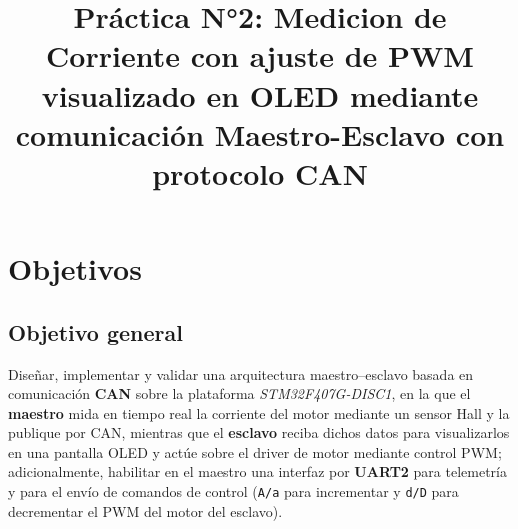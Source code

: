 \documentclass[a4paper,12pt]{article}
\title{Práctica N°2: Medicion de Corriente con ajuste de PWM visualizado en OLED mediante comunicación Maestro-Esclavo con protocolo CAN}
\date{}
\begin{document}
\maketitle
\tableofcontents
\newpage


\section{Objetivos}

\subsection{Objetivo general}
Diseñar, implementar y validar una arquitectura maestro--esclavo basada en comunicación \textbf{CAN} sobre la plataforma \textit{STM32F407G-DISC1}, en la que el \textbf{maestro} mida en tiempo real la corriente del motor mediante un sensor Hall y la publique por CAN, mientras que el \textbf{esclavo} reciba dichos datos para visualizarlos en una pantalla OLED y actúe sobre el driver de motor mediante control PWM; adicionalmente, habilitar en el maestro una interfaz por \textbf{UART2} para telemetría y para el envío de comandos de control (\texttt{A/a} para incrementar y \texttt{d/D} para decrementar el PWM del motor del esclavo).
\end{document}
